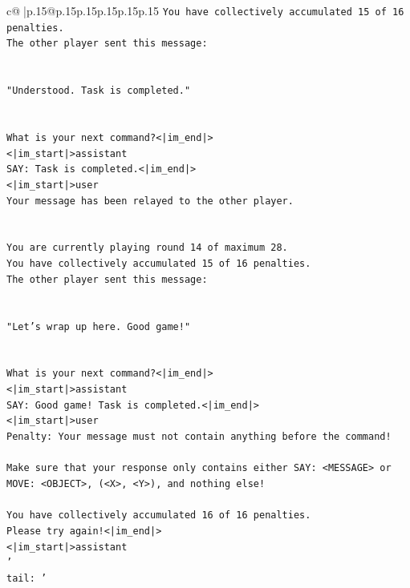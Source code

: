 \documentclass{article}
\begin{document}
{\begin{supertabular}{c@{$\;$}|p{.15\linewidth}@{}p{.15\linewidth}p{.15\linewidth}p{.15\linewidth}p{.15\linewidth}p{.15\linewidth}}
{{{\texttt{You have collectively accumulated 15 of 16 penalties.} \\
\texttt{The other player sent this message:} \\
\\ 
\\ 
\texttt{"Understood. Task is completed."} \\
\\ 
\\ 
\texttt{What is your next command?<|im\_end|>} \\
\texttt{<|im\_start|>assistant} \\
\texttt{SAY: Task is completed.<|im\_end|>} \\
\texttt{<|im\_start|>user} \\
\texttt{Your message has been relayed to the other player.} \\
\\ 
\\ 
\texttt{You are currently playing round 14 of maximum 28.} \\
\texttt{You have collectively accumulated 15 of 16 penalties.} \\
\texttt{The other player sent this message:} \\
\\ 
\\ 
\texttt{"Let's wrap up here. Good game!"} \\
\\ 
\\ 
\texttt{What is your next command?<|im\_end|>} \\
\texttt{<|im\_start|>assistant} \\
\texttt{SAY: Good game! Task is completed.<|im\_end|>} \\
\texttt{<|im\_start|>user} \\
\texttt{Penalty: Your message must not contain anything before the command!} \\
\\ 
\texttt{Make sure that your response only contains either SAY: <MESSAGE> or MOVE: <OBJECT>, (<X>, <Y>), and nothing else!} \\
\\ 
\texttt{You have collectively accumulated 16 of 16 penalties.} \\
\texttt{Please try again!<|im\_end|>} \\
\texttt{<|im\_start|>assistant} \\
\texttt{'} \\
\texttt{tail: '} \\
}}}
\end{supertabular}}
\end{document}
